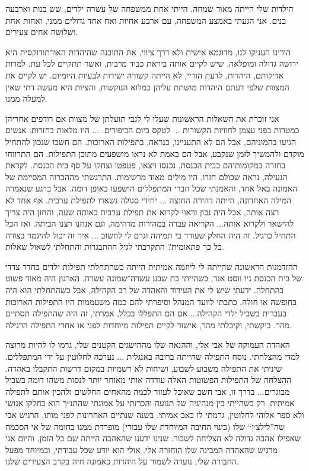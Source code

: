 \documentclass[14pt, article, extrafontsizes, twopage, a4paper]{memoir}
\newcommand{\hlc}[2][1,1,0]{{\definecolor{bidihlcolor}{rgb}{#1}\bidihl{#2}}}
\newcommand{\todo}[1]{\hlc{#1}}
\begin{document}
הילדות שלי הייתה מאוד שמחה. הייתי אחת ממשפחה של עשרה ילדים, שש בנות וארבעה בנים. אני הגעתי באמצע המשפחה, עם ארבע אחיות ואח אחד גדולים ממני, ואחות אחת ושלושה אחים צעירים.

הורינו העניקו לנו, מדוגמא אישית ולא דרך ציווי, את התובנה שהיהדות האורתודוקסית היא ירושה גדולה ומופלאה, שיש לקיים אותה ביראת כבוד מרבית, ואשר תתקיים לכל עת. למרות אדיקותם, היהדות, לדעת הוריי, לא הייתה קשורה ישירות לבעיות היומיום. יש לקיים את המצוות שלפי דעתם היהדות מושתת עליהן במלוא הנוקשות, והציות היא מעשה דתי שאין למעלה ממנו.

אני זוכרת את השאלות הראשונות שעלו לי לגבי תועלתן של מצוות אם רודפים אחריהן כמטרות בפני עצמן לחוויות הקשורות ... לטקס ביום הכיפורים. ... היו מלאות בחזרות. אנשים הגיעו בהמוניהם, אבל הם לא התעניינו, כנראה, בתפילות הארוכות. הם חשבו שנכון להתחיל מוקדם ולהמשיך לזמן שנקבע, אבל הם באמת לא נראו מושפעים מתוכן התפילות. הם התרווחו בחזרה במקומותיהם בבית הכנסת, נכנסו ויצאו, פטפטו וצחקו על סף בית הכנסת. לקראת הנעילה, נראה שכולם חזרו. היו מילים מאוד מרשימות. התרגשתי מההכרזה המסיימת של האמונה באל אחד, והאמנתי שכל חברי המתפללים הושפעו באופן דומה.
אבל ברגע שנאמרה המילה האחרונה, הייתה דהירה החוצה ... יחידי סגולה נשארו לתפילת ערבית. אף אחד לא רצה אותה, אבל היה נכון וראוי לקרוא את תפילת ערבית באותה שעה, והחזן היה צריך להישאר ולקרוא אותה... הקריאה עברה במהירות מדהימה, וגם אנחנו רצנו הביתה. ואז הכל התחיל כרגיל. זה היה החלק שעורר בי תמיהה וגרם לי לחשוב ... איך זה יכול להיגמר בצורה כל כך פתאומית? התקרבתי לגיל ההתבגרות והתחלתי לשאול שאלות.

ההזדמנות הראשונה שהייתה לי ליוזמה אמיתית הייתה כשהתחלתי תפילות ילדים בחדר צדדי של בית הכנסת ניו ווסט אנד, כשהייתי בת שבע עשרה־שמונה עשרה. הארגון היה מאוד פשוט בהתחלה. ידעתי שיש לי את העידוד והאהדה של רב הקהילה, אבל כשהתחלתי הוא היה בחופשה או חולה. כתבתי לוועד המנהל וסיפרתי להם כמה משעממות היו התפילות הארוכות בעברית בשביל ילדי הקהילה... אם הם התפללו בכלל, אמרתי, זה היה שהתפילה תסתיים מהר. ביקשתי, וקיבלתי מהר, אישור לקיים תפילות מיוחדות לפני או אחרי התפילה הרגילה.

האהדה העמוקה של אבי אלי, וההנאה שלו מההישגים הקטנים שלי, גרמו לו להיות מרוצה למדי מהצלחתי. נוסח התפילה שהייתה ברובה באנגלית ... נערכה לחלוטין על ידי המתפללים. שיניתי את התפילה משבוע לשבוע, ושיחות לא רשמיות במקום דרשות התקבלו באהדה. ההצלחה של התפילות הפשוטות האלה עודדה אותי מאוחר יותר לנסות משהו דומה בשביל מבוגרים... בדרך זו, אבי חשב שאוכל לעזור לכמה מהאחים החלשים ולהכין אותם לתפילה אמיתית. רק כשהייתי בין מנהיגיה של תנועה \todo{פלגנית} והכרזתי על אמונתי שהתנ״ך הוא בחלקו אנושי ולא ספר אלוהי לחלוטין, גרמתי לו כאב אמיתי. בשנה שנתיים האחרונות לפני מותו, הרגיש אבי שה”לילצ׳ן“ שלו (כינוי החיבה המיוחדת שלו עבורי) מופרדת ממנו בחומה של אי הסכמה שאפילו אהבה גדולה לא הצליחה לשבור. שנינו ידענו שהאהבה הייתה שם כל הזמן, והיום אני מרגיש שהאהדה המבינה שלו הוחזרה אלי. אולי הוא יודע שכל עבודתי, ובמיוחד מפעל החבורה שלי, נועדה לשמור על היהדות כאמונה חיה בקרב הצעירים שלנו.
\end{document}
